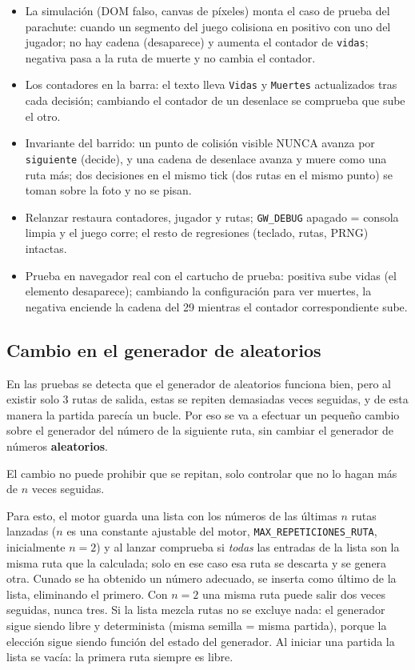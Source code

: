 \begin{itemize}
	\item La simulación (DOM falso, canvas de píxeles) monta el caso de prueba del parachute:
	cuando un segmento del juego colisiona en positivo con uno del jugador; no hay cadena (desaparece) y aumenta el contador de 
	\texttt{vidas}; negativa pasa a la ruta de muerte y no cambia el contador. 
	
	\item Los contadores en la barra: el texto lleva \texttt{Vidas} y
	\texttt{Muertes} actualizados tras cada decisión; cambiando el contador de un desenlace se comprueba que sube el otro.
	
	\item Invariante del barrido: un punto de colisión visible NUNCA avanza por
	\texttt{siguiente} (decide), y una cadena de desenlace avanza y muere como una
	ruta más; dos decisiones en el mismo tick (dos rutas en el mismo punto) se
	toman sobre la foto y no se pisan.
	\item Relanzar restaura contadores, jugador y rutas; \texttt{GW\_DEBUG} apagado
	= consola limpia y el juego corre; el resto de regresiones (teclado, rutas,
	PRNG) intactas.
	\item Prueba en navegador real con el cartucho de prueba: positiva sube vidas
	(el elemento desaparece); cambiando la configuración para ver muertes, la
	negativa enciende la cadena del 29 mientras el contador correspondiente sube.
\end{itemize}

\subsection{Cambio en el generador de aleatorios}
\label{subsec:CambioAleatorios}

En las pruebas se detecta que el generador de aleatorios funciona bien, pero al existir solo 3 rutas de salida, estas se repiten demasiadas veces seguidas, y de esta manera la partida parecía un
bucle. Por eso se va a efectuar un pequeño cambio sobre el generador del número de la siguiente ruta, sin cambiar el generador de números \textbf{aleatorios}.

El cambio no puede prohibir que se repitan, solo controlar que no lo hagan más de $n$ veces seguidas. 

Para esto, el motor guarda una lista con los números de las
últimas $n$ rutas lanzadas ($n$ es una constante ajustable del motor,
\texttt{MAX\_REPETICIONES\_RUTA}, inicialmente $n=2$) y al lanzar comprueba si
\emph{todas} las entradas de la lista son la misma ruta que la calculada; solo en ese caso esa ruta se descarta y se genera otra. Cunado se ha obtenido un número adecuado, se inserta como último de la lista, eliminando el primero. Con $n=2$ una misma ruta puede
salir dos veces seguidas, nunca tres. Si la lista mezcla rutas no se excluye
nada: el generador sigue siendo libre y determinista (misma semilla = misma
partida), porque la elección sigue siendo función del estado del generador. Al iniciar una partida la lista se vacía: la primera ruta siempre es libre.
